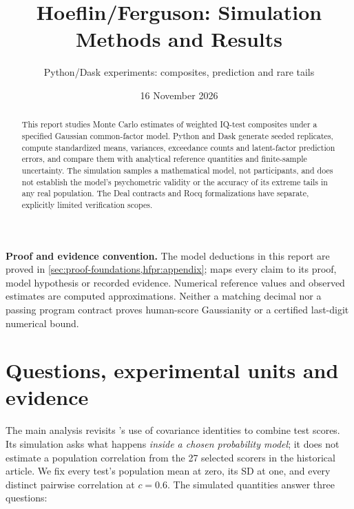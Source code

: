 
\title{Hoeflin/Ferguson: Simulation Methods and Results}
\subtitle{Python/Dask experiments: composites, prediction and rare tails}
\author{\ProjectAuthor}
\date{16 November 2026}

\renewcommand{\ProjectReportHighlights}{Under the stated Gaussian common-factor model, the variance of the
average of \(n\) standardized tests is \(c+(1-c)/n\). The synthetic
Python/Dask experiments check predicted moments and tail counts, not
psychometric validity in human populations.}


\frontmatter
\ProjectReportTitlePage


\begin{abstract}
This report studies Monte Carlo estimates of weighted IQ-test composites
under a specified Gaussian common-factor model. Python and Dask generate
seeded replicates, compute standardized means, variances, exceedance
counts and latent-factor prediction errors, and compare them with
analytical reference quantities and finite-sample uncertainty.
The simulation samples a mathematical model, not participants, and does
not establish the model's psychometric validity or the accuracy of its
extreme tails in any real population. The Deal contracts and Rocq
formalizations have separate, explicitly limited verification scopes.
\end{abstract}

\noindent\textbf{Proof and evidence convention.} The model deductions in
this report are proved in \cref{sec:proof-foundations,hfpr:appendix};
 maps every claim to
its proof, model hypothesis or recorded evidence. Numerical reference
values and observed estimates are computed approximations. Neither a
matching decimal nor a passing program contract proves human-score
Gaussianity or a certified last-digit numerical bound.

\tableofcontents
\mainmatter

\chapter{Questions, experimental units and evidence}
The main analysis revisits \citet{hoeflin}'s use of covariance identities to
combine test scores. Its simulation asks what happens \emph{inside a chosen
probability model}; it does not estimate a population correlation from the
27 selected scorers in the historical article. We fix every test's
population mean at zero, its SD at one, and every distinct pairwise
correlation at \(c=0.6\). The simulated quantities answer three questions:

